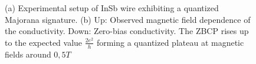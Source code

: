 \begin{figure}[t]
\centering

\caption{ (a) Experimental setup of InSb wire exhibiting a quantized Majorana signature. (b) Up: Observed magnetic field dependence of the conductivity. Down: Zero-bias conductivity. The ZBCP rises up to the expected value $\frac{2e^2}{h}$  forming a quantized plateau at magnetic fields around $0,5T$  \label{fig:exp}\protect{}}
\end{figure}

